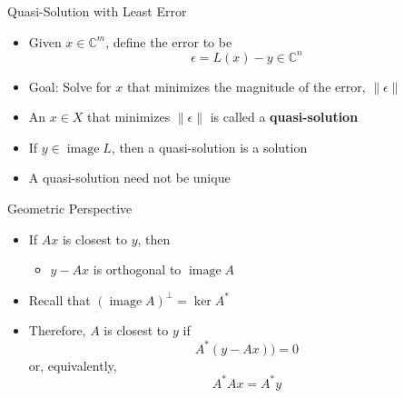 \documentclass[usenames,dvipsnames,10pt]{beamer}
\newcommand\C{\mathbb{C}}
\newcommand\image{\operatorname{image}}
\begin{document}
\begin{frame}
  {Quasi-Solution with Least Error}

  \begin{itemize}
  \item Given $x \in \C^m$, define the error to be
    \[
      \epsilon = L(x) - y \in \C^n
    \]
  \item Goal: Solve for $x$ that minimizes the magnitude of the error, $\|\epsilon\|$
  \item An $x \in X$ that minimizes $\|\epsilon\|$ is called a {\bf quasi-solution}
  \item If $y \in \image L$, then a quasi-solution is a solution
  \item A quasi-solution need not be unique
  \end{itemize}
\end{frame}

\begin{frame}
  {Geometric Perspective}

  \begin{center}
  \end{center}
  \begin{itemize}
  \item If $Ax$ is closest to $y$, then
    \begin{itemize}
    \item $y-Ax$ is orthogonal to $\image A$
    \end{itemize}
  \item Recall that $(\image A)^\perp = \ker A^*$
  \item Therefore, $A$ is closest to $y$ if
    \[
      A^*(y-Ax)) = 0
    \]
    or, equivalently,
    \[
      A^*Ax = A^*y
    \]
  \end{itemize}
\end{frame}
\end{document}
